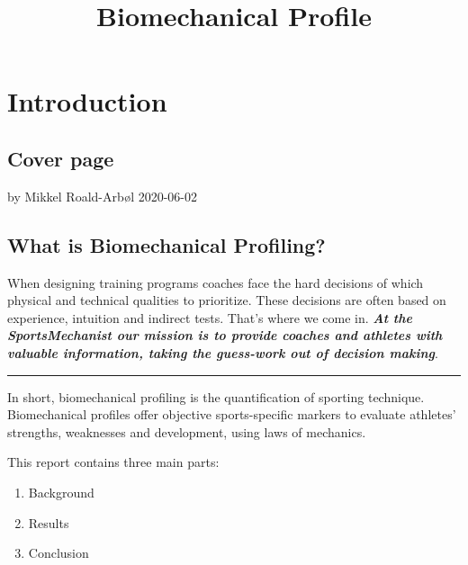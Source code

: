 \documentclass[]{scrreprt}
\title{Biomechanical Profile}
\author{}
\date{\vspace{-2.5em}}
\providecommand{\tightlist}{%
  \setlength{\itemsep}{0pt}\setlength{\parskip}{0pt}}
\begin{document}
\maketitle

{
\setcounter{tocdepth}{1}
\tableofcontents
}
\hypertarget{part-introduction}{%
\part{Introduction}\label{part-introduction}}

\hypertarget{cover-page}{%
\chapter*{Cover page}\label{cover-page}}

by Mikkel Roald-Arbøl
2020-06-02

\hypertarget{what-is-biomechanical-profiling}{%
\chapter*{What is Biomechanical Profiling?}\label{what-is-biomechanical-profiling}}

When designing training programs coaches face the hard decisions of which physical and technical qualities to prioritize. These decisions are often based on experience, intuition and indirect tests. That's where we come in. \textbf{\emph{At the SportsMechanist our mission is to provide coaches and athletes with valuable information, taking the guess-work out of decision making}}.

\begin{center}\rule{0.5\linewidth}{0.5pt}\end{center}

In short, biomechanical profiling is the quantification of sporting technique.
Biomechanical profiles offer objective sports-specific markers to evaluate athletes' strengths, weaknesses and development, using laws of mechanics.

This report contains three main parts:

\begin{enumerate}
\def\labelenumi{\arabic{enumi}.}
\tightlist
\item
  Background
\item
  Results
\item
  Conclusion
\end{enumerate}
\end{document}
